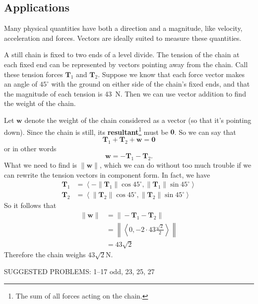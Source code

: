 \documentclass[10pt,]{book}
\newcommand{\terminology}[1]{\textbf{#1}}
\theoremstyle{ptxplainnotitle}
\theoremstyle{ptxplaintitle}
\theoremstyle{ptxplainnotitle}
\theoremstyle{ptxplaintitle}
\theoremstyle{ptxplainnotitle}
\theoremstyle{ptxplaintitle}
\theoremstyle{ptxdefinitionnotitle}
\theoremstyle{ptxdefinitiontitle}
\theoremstyle{ptxdefinitionnotitle}
\theoremstyle{ptxdefinitiontitle}
\theoremstyle{ptxdefinitionnotitle}
\theoremstyle{ptxdefinitiontitle}
\theoremstyle{ptxdefinitionnotitle}
\theoremstyle{ptxdefinitiontitle}
\theoremstyle{ptxdefinitionnotitle}
\theoremstyle{ptxdefinitiontitle}
\numberwithin{equation}{section}
\newcommand{\vv}[1]{\mathbf{#1}}
\newcommand{\dotprod}[1]{\left\langle #1 \right\rangle}
\begin{document}
\subsection[{Applications}]{Applications}\label{subsection-applications}
\hypertarget{p-774}{}%
Many physical quantities have both a direction and a magnitude, like velocity, acceleration and forces. Vectors are ideally suited to measure these quantities.%
\begin{example}\label{example-weight-of-a-chain}
\hypertarget{p-775}{}%
A still chain is fixed to two ends of a level divide. The tension of the chain at each fixed end can be represented by vectors pointing away from the chain. Call these tension forces \(\vv{T}_{1}\) and \(\vv{T}_{2}\). Suppose we know that each force vector makes an angle of \(45^{\circ}\) with the ground on either side of the chain's fixed ends, and that the magnitude of each tension is \SI{43}{\newton}. Then we can use vector addition to find the weight of the chain.%
\par
\hypertarget{p-776}{}%
Let \(\vv{w}\) denote the weight of the chain considered as a vector (so that it's pointing down). Since the chain is still, its \terminology{resultant}\footnote{The sum of all forces acting on the chain.\label{fn-4}} must be \(\vv{0}\). So we can say that%
%
\begin{equation*}
\vv{T}_{1}+\vv{T}_{2} + \vv{w} = \vv{0}
\end{equation*}
\hypertarget{p-777}{}%
or in other words%
%
\begin{equation*}
\vv{w} = -\vv{T}_{1}-\vv{T}_{2}.
\end{equation*}
\hypertarget{p-778}{}%
What we need to find is \(\|\vv{w}\|\), which we can do without too much trouble if we can rewrite the tension vectors in component form. In fact, we have%
%
\begin{align*}
\vv{T}_{1} & = \dotprod{-\|\vv{T}_{1}\|\cos45^{\circ},\|\vv{T}_{1}\|\sin45^{\circ}} \\
\vv{T}_{2} & = \dotprod{\|\vv{T}_{2}\|\cos45^{\circ},\|\vv{T}_{2}\|\sin45^{\circ}} 
\end{align*}
\hypertarget{p-779}{}%
So it follows that%
%
\begin{align*}
\|\vv{w}\| & = \|-\vv{T}_{1}-\vv{T}_{2}\| \\
& = \left\|\dotprod{0,-2\cdot43\frac{\sqrt{2}}{2}}\right\|\\
& = 43\sqrt{2} 
\end{align*}
\hypertarget{p-780}{}%
Therefore the chain weighs \(43\sqrt{2}\)\si{\newton}.%
\end{example}
\hypertarget{p-781}{}%
SUGGESTED PROBLEMS: 1--17 odd, 23, 25, 27%
\typeout{************************************************}
\typeout{************************************************}
\end{document}
